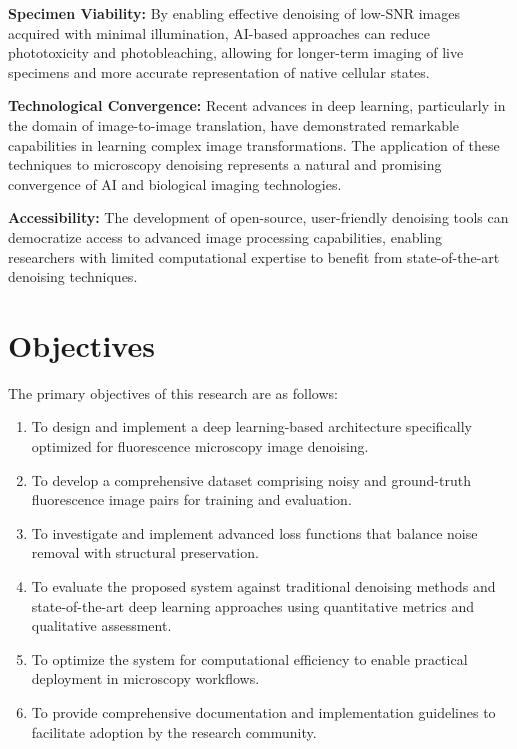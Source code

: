 \documentclass[12pt,a4paper]{report}
\begin{document}
\vspace{0.5cm}

\textbf{Specimen Viability:} By enabling effective denoising of low-SNR images acquired with minimal illumination, AI-based approaches can reduce phototoxicity and photobleaching, allowing for longer-term imaging of live specimens and more accurate representation of native cellular states.

\vspace{0.5cm}

\textbf{Technological Convergence:} Recent advances in deep learning, particularly in the domain of image-to-image translation, have demonstrated remarkable capabilities in learning complex image transformations. The application of these techniques to microscopy denoising represents a natural and promising convergence of AI and biological imaging technologies.

\vspace{0.5cm}

\textbf{Accessibility:} The development of open-source, user-friendly denoising tools can democratize access to advanced image processing capabilities, enabling researchers with limited computational expertise to benefit from state-of-the-art denoising techniques.

\section{Objectives}

The primary objectives of this research are as follows:

\vspace{0.5cm}

\begin{enumerate}
    \item To design and implement a deep learning-based architecture specifically optimized for fluorescence microscopy image denoising.

    \item To develop a comprehensive dataset comprising noisy and ground-truth fluorescence image pairs for training and evaluation.

    \item To investigate and implement advanced loss functions that balance noise removal with structural preservation.

    \item To evaluate the proposed system against traditional denoising methods and state-of-the-art deep learning approaches using quantitative metrics and qualitative assessment.

    \item To optimize the system for computational efficiency to enable practical deployment in microscopy workflows.

    \item To provide comprehensive documentation and implementation guidelines to facilitate adoption by the research community.
\end{enumerate}
\end{document}
